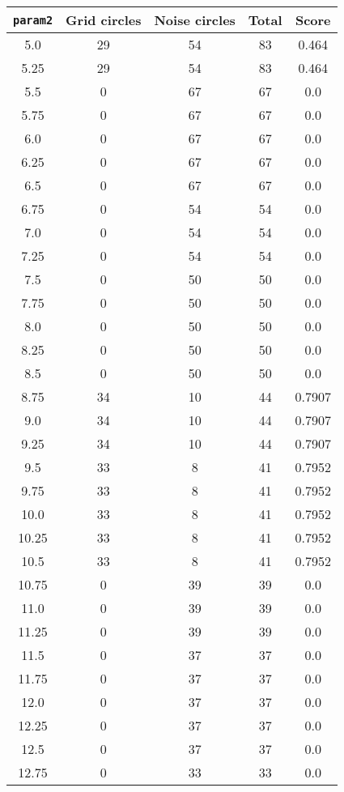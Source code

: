 \documentclass[letterpaper, 12pt]{article}
\begin{document}
\begin{longtable}{|c|c|c|c|c|}
\hline
\textbf{\texttt{param2}} & \textbf{Grid circles} & \textbf{Noise circles} & \textbf{Total} & \textbf{Score} \\
\hline
5.0 & 29 & 54 & 83 & 0.464 \\
\hline
5.25 & 29 & 54 & 83 & 0.464 \\
\hline
5.5 & 0 & 67 & 67 & 0.0 \\
\hline
5.75 & 0 & 67 & 67 & 0.0 \\
\hline
6.0 & 0 & 67 & 67 & 0.0 \\
\hline
6.25 & 0 & 67 & 67 & 0.0 \\
\hline
6.5 & 0 & 67 & 67 & 0.0 \\
\hline
6.75 & 0 & 54 & 54 & 0.0 \\
\hline
7.0 & 0 & 54 & 54 & 0.0 \\
\hline
7.25 & 0 & 54 & 54 & 0.0 \\
\hline
7.5 & 0 & 50 & 50 & 0.0 \\
\hline
7.75 & 0 & 50 & 50 & 0.0 \\
\hline
8.0 & 0 & 50 & 50 & 0.0 \\
\hline
8.25 & 0 & 50 & 50 & 0.0 \\
\hline
8.5 & 0 & 50 & 50 & 0.0 \\
\hline
8.75 & 34 & 10 & 44 & 0.7907 \\
\hline
9.0 & 34 & 10 & 44 & 0.7907 \\
\hline
9.25 & 34 & 10 & 44 & 0.7907 \\
\hline
9.5 & 33 & 8 & 41 & 0.7952 \\
\hline
9.75 & 33 & 8 & 41 & 0.7952 \\
\hline
10.0 & 33 & 8 & 41 & 0.7952 \\
\hline
10.25 & 33 & 8 & 41 & 0.7952 \\
\hline
10.5 & 33 & 8 & 41 & 0.7952 \\
\hline
10.75 & 0 & 39 & 39 & 0.0 \\
\hline
11.0 & 0 & 39 & 39 & 0.0 \\
\hline
11.25 & 0 & 39 & 39 & 0.0 \\
\hline
11.5 & 0 & 37 & 37 & 0.0 \\
\hline
11.75 & 0 & 37 & 37 & 0.0 \\
\hline
12.0 & 0 & 37 & 37 & 0.0 \\
\hline
12.25 & 0 & 37 & 37 & 0.0 \\
\hline
12.5 & 0 & 37 & 37 & 0.0 \\
\hline
12.75 & 0 & 33 & 33 & 0.0 \\

\end{longtable}
\end{document}
